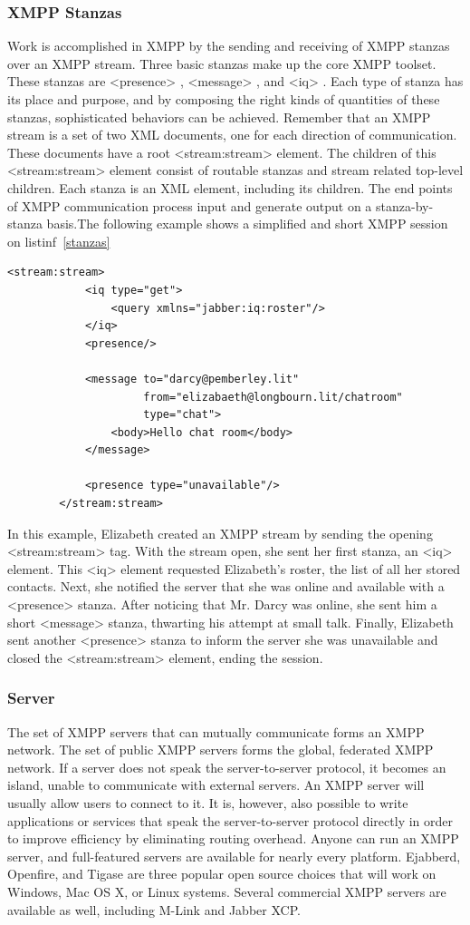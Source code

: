 	\subsubsection{XMPP Stanzas}
	Work is accomplished in XMPP by the sending and receiving of XMPP stanzas over an XMPP stream. Three basic stanzas make up the core XMPP toolset. These stanzas are <presence> , <message> , and <iq> . Each type of stanza has its place and purpose, and by composing the right kinds of quantities of these stanzas, sophisticated behaviors can be achieved. Remember that an XMPP stream is a set of two XML documents, one for each direction of communication. These documents have a root <stream:stream> element. The children of this <stream:stream> element consist of routable stanzas and stream related top-level children. Each stanza is an XML element, including its children. The end points of XMPP communication process input and generate output on a stanza-by-stanza basis.The following example shows a simplified and short XMPP session on listinf~\ref{stanzas}
		\begin{lstlisting}[label=stanzas,caption=Stanzas Format]
		<stream:stream>
			<iq type="get">
				<query xmlns="jabber:iq:roster"/>
			</iq>
			<presence/>

			<message to="darcy@pemberley.lit"
					 from="elizabaeth@longbourn.lit/chatroom"
			         type="chat">
			    <body>Hello chat room</body>
			</message> 

			<presence type="unavailable"/>
		</stream:stream>
		\end{lstlisting}

	In this example, Elizabeth created an XMPP stream by sending the opening <stream:stream> tag. With the stream open, she sent her first stanza, an <iq> element. This <iq> element requested Elizabeth’s roster, the list of all her stored contacts. Next, she notified the server that she was online and available with a <presence> stanza. After noticing that Mr. Darcy was online, she sent him a short <message> stanza, thwarting his attempt at small talk. Finally, Elizabeth sent another <presence> stanza to inform the server she was unavailable and closed the <stream:stream> element, ending the session.
    
    \subsubsection{Server}
	The set of XMPP servers that can mutually communicate forms an XMPP network. The set of public XMPP servers forms the global, federated XMPP network. If a server does not speak the server-to-server protocol, it becomes an island, unable to communicate with external servers. An XMPP server will usually allow users to connect to it. It is, however, also possible to write applications or services that speak the server-to-server protocol directly in order to improve efficiency by eliminating routing overhead. Anyone can run an XMPP server, and full-featured servers are available for nearly every platform. Ejabberd, Openfire, and Tigase are three popular open source choices that will work on Windows, Mac OS X, or Linux systems. Several commercial XMPP servers are available as well, including M-Link and Jabber XCP.
	

